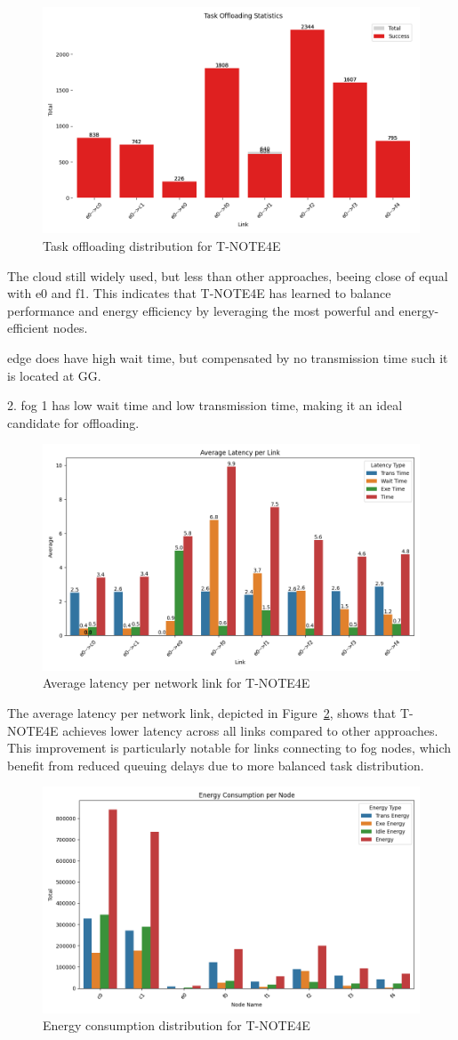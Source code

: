 \documentclass[preprint,3p,authoryear]{elsarticle}
\begin{document}
\begin{figure}[H]
    \centering
    \includegraphics[width=0.5\linewidth]{figs/T-NOTE4E/task_offloading_statistics.png}
    \caption{Task offloading distribution for T-NOTE4E}
    \label{fig:T-NOTE4E-offloading-stats}
\end{figure}

The cloud still widely used, but less than other approaches, beeing close of equal with e0 and f1. This indicates that T-NOTE4E has learned to balance performance and energy efficiency by leveraging the most powerful and energy-efficient nodes. 

edge does have high wait time, but compensated by no transmission time such it is located at GG.

2. fog 1 has low wait time and low transmission time, making it an ideal candidate for offloading.

\begin{figure}[H]
    \centering
    \includegraphics[width=0.5\linewidth]{figs/T-NOTE4E/avg_latency_per_link.png}
    \caption{Average latency per network link for T-NOTE4E}
    \label{fig:T-NOTE4E-avg-latency}
\end{figure}

The average latency per network link, depicted in Figure~\ref{fig:T-NOTE4E-avg-latency}, shows that T-NOTE4E achieves lower latency across all links compared to other approaches. This improvement is particularly notable for links connecting to fog nodes, which benefit from reduced queuing delays due to more balanced task distribution.

\begin{figure}[H]
    \centering
    \includegraphics[width=0.5\linewidth]{figs/T-NOTE4E/energy_consumption_per_node.png}
    \caption{Energy consumption distribution for T-NOTE4E}
    \label{fig:T-NOTE4E-energy-consumption}
\end{figure}
\end{document}
